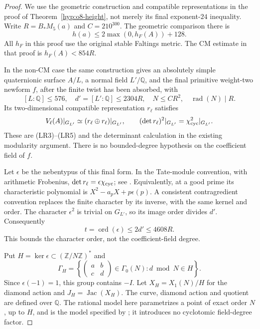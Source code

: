 \begin{proof}
We use the geometric construction and compatible representations in the
proof of Theorem~\ref{hyp:o8-height}, not merely its final exponent-$24$
inequality. Write $R=B_*M_5(a)$ and $C=210^{300}$.
The geometric comparison there is
\[
 h(a)\le2\max(0,h_F(A))+128.
\]
All $h_F$ in this proof use the original stable Faltings metric.
The CM estimate in that proof is $h_F(A)<854R$.

In the non-CM case the same construction gives an absolutely simple
quaternionic surface $A/L$, a normal field $L'/\mathbb Q$, and the final
primitive weight-two newform $f$, after the finite twist has been
absorbed, with
\[
 [L:\mathbb Q]\le576,\quad d'=[L':\mathbb Q]\le2304R,\quad
 N\le CR^2,\quad \operatorname{rad}(N)\mid R.
\]
Its two-dimensional compatible representation $r_\ell$ satisfies
\[
 V_\ell(A)|_{G_{L'}}\simeq
       (r_\ell\oplus r_\ell)|_{G_{L'}},\qquad
 (\det r_\ell)^2|_{G_{L'}}=\chi_{\rm cyc}^2|_{G_{L'}}.
\]
These are (LR3)--(LR5) and the determinant calculation in the existing
modularity argument. There is no bounded-degree hypothesis on the
coefficient field of $f$.

Let $\epsilon$ be the nebentypus of this final form. In the Tate-module
convention, with arithmetic Frobenius, $\det r_\ell=\epsilon\chi_{\rm cyc}$;
see \cite[\S12.5, (12.5.1)--(12.5.2) and Remark 12.5.1,
pp.~119--120]{diamond-im}. Equivalently, at a good prime its
characteristic polynomial is $X^2-a_pX+p\epsilon(p)$.
A consistent contragredient convention replaces the finite character by
its inverse, with the same kernel and order. The character $\epsilon^2$
is trivial on $G_{L'}$, so its image order divides $d'$. Consequently
\[
 t=\operatorname{ord}(\epsilon)\le2d'\le4608R.
\]
This bounds the character order, not the coefficient-field degree.

Put $H=\ker\epsilon\subset(\mathbb Z/N\mathbb Z)^*$ and
\[
 \Gamma_H=\left\{
 \begin{pmatrix}a&b\\c&d\end{pmatrix}\in\Gamma_0(N):
 d\bmod N\in H\right\}.
\]
Since $\epsilon(-1)=1$, this group contains $-I$.
Let $X_H=X_1(N)/H$ for the diamond action and $J_H=\operatorname{Jac}(X_H)$.
The curve, diamond action and quotient are defined over $\mathbb Q$.
The rational model here parametrizes a point of exact order $N$, up to
$H$, and is the model specified by \cite[\S2.1, (2.1.8)]{mascot-moduli};
it introduces no cyclotomic field-degree factor.


\end{proof}
